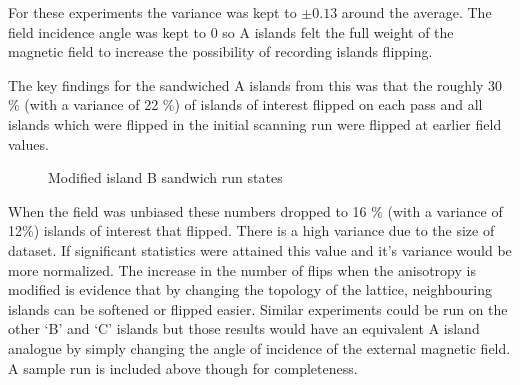 \clearpage
For these experiments the variance was kept to $\pm 0.13$ around the average. The field incidence angle was kept to 0 so A islands felt the full weight of the magnetic field to increase the possibility of recording islands flipping.
\par
The key findings for the sandwiched A islands from this was that the roughly 30 \% (with a variance of 22 \%) of islands of interest flipped on each pass and all islands which were flipped in the initial scanning run were flipped at earlier field values.
\par
\begin{figure}[ht!]
    \begin{center}
\qquad
        \caption[Modified island B sandwich run states]{Modified island B sandwich run states}
        \label{fi g:gf12}
    \end{center}
\end{figure}
When the field was unbiased these numbers dropped to 16 \% (with a variance of 12\%) islands of interest that flipped.  There is a high variance due to the size of dataset.  If significant statistics were attained this value and it's variance would be more normalized.  The increase in the number of flips when the anisotropy is modified is evidence that by changing the topology of the lattice, neighbouring islands can be softened or flipped easier. Similar experiments could be run on the other `B' and `C' islands but those results would have an equivalent A island analogue by simply changing the angle of incidence of the external magnetic field. A sample run is included above though for completeness.
\par
